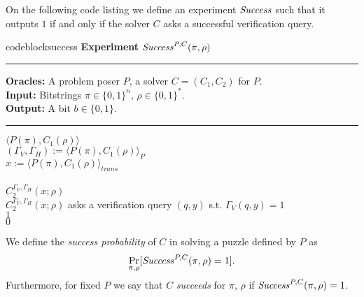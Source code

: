 On the following code listing we define an experiment $\operatorname{\mathit{Success}}$ such that
it outputs $1$ if and only if the solver $C$ asks a successful verification query.
%
\begin{restatable}{codeblock}{success}
  \textbf{Experiment} $\operatorname{\mathit{Success}}^{P, C}(\pi, \rho)$
  \medskip \hrule
  \textbf{Oracles:} A problem poser $P$, a solver $C = (C_1, C_2)$ for $P$.\\
  \textbf{Input:}  Bitstrings $\pi \in \{0,1\}^n$, $\rho \in \{0,1\}^*$.\\
  \textbf{Output:} A bit $b \in \{0,1\}$.
  \medskip\hrule
  \Run $\langle P(\pi), C_1(\rho) \rangle$ \\
  \IndI $(\Gamma_V, \Gamma_H) := \langle P(\pi), C_1(\rho) \rangle_{P}$ \\
  \IndI $x := \langle P(\pi), C_1(\rho) \rangle_{\mathit{trans}}$ \\ \\
  \Run $C_2^{\Gamma_V,\Gamma_H}(x; \rho)$ \\
  \IndI \If $C_2^{\Gamma_V, \Gamma_H}(x; \rho)$ asks a verification query $(q, y)$ s.t. $\Gamma_V(q, y) = 1$ \Then \\
  \IndII \Return $1$ \\
  \Return $0$
\end{restatable}
%
We define the \textit{success probability} of $C$ in solving a puzzle defined by $P$ as
\begin{align}
 \underset{\pi, \rho}{\Pr}[\operatorname{\mathit{Success}}^{P,C}(\pi, \rho) = 1].
\end{align}
Furthermore, for fixed $P$ we say that $C$ \textit{succeeds} for $\pi$, $\rho$ if $\operatorname{\mathit{Success}}^{P,C}(\pi, \rho) = 1$.

